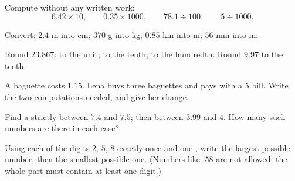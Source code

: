 \begin{exercise}[$\star$]\label{exo:g6:decimals:7}
Compute without any written work:
\[
6.42 \times 10, \qquad
0.35 \times 1000, \qquad
78.1 \div 100, \qquad
5 \div 1000 .
\]
\end{exercise}

\begin{exercise}[$\star$]\label{exo:g6:decimals:8}
Convert: $2.4$ m into cm; \quad $370$ g into kg; \quad $0.85$ km into
m; \quad $56$ mm into m.
\end{exercise}

\begin{exercise}[$\star$]\label{exo:g6:decimals:9}
Round $23.867$: to the unit; to the tenth; to the hundredth. Round
$9.97$ to the tenth.
\end{exercise}

\begin{exercise}[$\star\star$]\label{exo:g6:decimals:10}
A baguette costs $1.15$. Lena buys three baguettes and pays with a
$5$ bill. Write the two computations needed, and give her change.
\end{exercise}

\begin{exercise}[$\star\star$]\label{exo:g6:decimals:11}
Find a  strictly between $7.4$ and $7.5$; then between
$3.99$ and $4$. How many such numbers are there in each case?
\end{exercise}

\begin{exercise}[$\star\star\star$]\label{exo:g6:decimals:12}
Using each of the digits $2$, $5$, $8$ exactly once and one , write the largest possible number, then the smallest possible
one. (Numbers like $.58$ are not allowed: the whole part must contain
at least one digit.)
\end{exercise}

